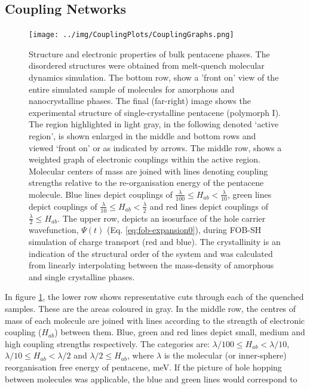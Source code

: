\subsection{Coupling Networks}
\label{sect:couplGraphs}
\begin{figure}[ht]
	\texttt{[image: ../img/CouplingPlots/CouplingGraphs.png]}
	\caption{\label{fig:crystalCouplingGraph}Structure and electronic properties of bulk pentacene phases.  The disordered structures were obtained from melt-quench molecular dynamics simulation.   
	The bottom row, show a 'front on' view of the entire simulated sample of  molecules for amorphous and nanocrystalline phases.  The final (far-right) image shows the experimental structure of single-crystalline pentacene (polymorph I)\cite{Campbell1961}.  
    The region highlighted in light gray, in the following denoted `active region', is shown enlarged in the middle and bottom rows and viewed `front on' or as indicated by arrows. 
     The middle row, shows a weighted graph of electronic couplings within the active region. Molecular centers of mass are joined with lines denoting coupling 
    strengths relative to the re-organisation energy of the pentacene molecule. Blue lines depict couplings of $\frac{\lambda}{100} \le H_{ab} < \frac{\lambda}{10}$, 
    green lines depict couplings of $\frac{\lambda}{10} \le H_{ab} < \frac{\lambda}{2}$ and red lines depict couplings of $\frac{\lambda}{2} \le H_{ab}$.
     The upper row, depicts an isosurface of the hole carrier wavefunction, $\Psi(t)$ (Eq. \eqref{eq:fob-expansion0}), during 
     FOB-SH simulation of charge transport (red and blue).
     The crystallinity is an indication of the structural order of the system and was calculated from linearly interpolating between the mass-density of amorphous and single crystalline 
	 phases.}
\end{figure}
\noindent In figure \ref{fig:crystalCouplingGraph}, the lower row shows representative  cuts through each of the quenched samples. These are the areas coloured in gray. In the middle row, the centres of mass of each molecule are joined with lines according to 
the strength of electronic coupling ($H_{ab}$) between them. Blue, green and red lines depict small, medium and high coupling strengths respectively. The categories are: 
$\lambda/100 \le H_{ab} < \lambda/10$,  $\lambda/10 \le H_{ab} < \lambda/2$ and $\lambda/2 \le H_{ab}$, where $\lambda$ is the molecular (or inner-sphere) 
reorganisation free energy of pentacene,  meV.  If the picture of hole hopping between molecules was applicable, the blue and green lines would correspond to 
